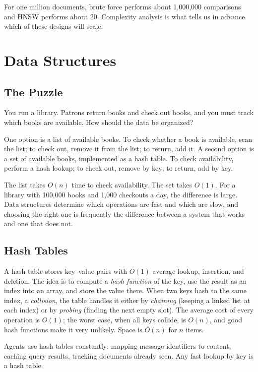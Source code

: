 \documentclass[11pt]{book}
\begin{document}
For one million documents, brute force performs about 1{,}000{,}000 comparisons and HNSW performs about 20. Complexity analysis is what tells us in advance which of these designs will scale.

\section{Data Structures}

\subsection{The Puzzle}

You run a library. Patrons return books and check out books, and you must track which books are available. How should the data be organized?

One option is a list of available books. To check whether a book is available, scan the list; to check out, remove it from the list; to return, add it. A second option is a set of available books, implemented as a hash table. To check availability, perform a hash lookup; to check out, remove by key; to return, add by key.

The list takes $O(n)$ time to check availability. The set takes $O(1)$. For a library with 100{,}000 books and 1{,}000 checkouts a day, the difference is large. Data structures determine which operations are fast and which are slow, and choosing the right one is frequently the difference between a system that works and one that does not.

\subsection{Hash Tables}

A hash table stores key--value pairs with $O(1)$ average lookup, insertion, and deletion. The idea is to compute a \emph{hash function} of the key, use the result as an index into an array, and store the value there. When two keys hash to the same index, a \emph{collision}, the table handles it either by \emph{chaining} (keeping a linked list at each index) or by \emph{probing} (finding the next empty slot). The average cost of every operation is $O(1)$; the worst case, when all keys collide, is $O(n)$, and good hash functions make it very unlikely. Space is $O(n)$ for $n$ items.

Agents use hash tables constantly: mapping message identifiers to content, caching query results, tracking documents already seen. Any fast lookup by key is a hash table.
\end{document}
